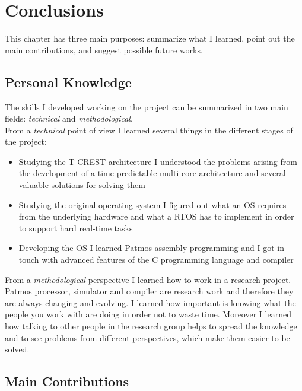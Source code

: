 \chapter{Conclusions}

This chapter has three main purposes: summarize what I learned, point out the main contributions, and suggest possible future works.

\section{Personal Knowledge}
The skills I developed working on the project can be summarized in two main fields: \textit{technical} and \textit{methodological}.\\
From a \textit{technical} point of view I learned several things in the different stages of the project:

\begin{itemize}
	\item Studying the T-CREST architecture I understood the problems arising from the development of a time-predictable multi-core architecture and several valuable solutions for solving them
	\item Studying the original operating system I figured out what an OS requires from the underlying hardware and what a RTOS has to implement in order to support hard real-time tasks
	\item Developing the OS I learned Patmos assembly programming and I got in touch with advanced features of the C programming language and compiler
\end{itemize}

From a \textit{methodological} perspective I learned how to work in a research project. Patmos processor, simulator and compiler are research work and therefore they are always changing and evolving. I learned how important is knowing what the people you work with are doing in order not to waste time. Moreover I learned how talking to other people in the research group helps to spread the knowledge and to see problems from different perspectives, which make them easier to be solved.

\section{Main Contributions}

